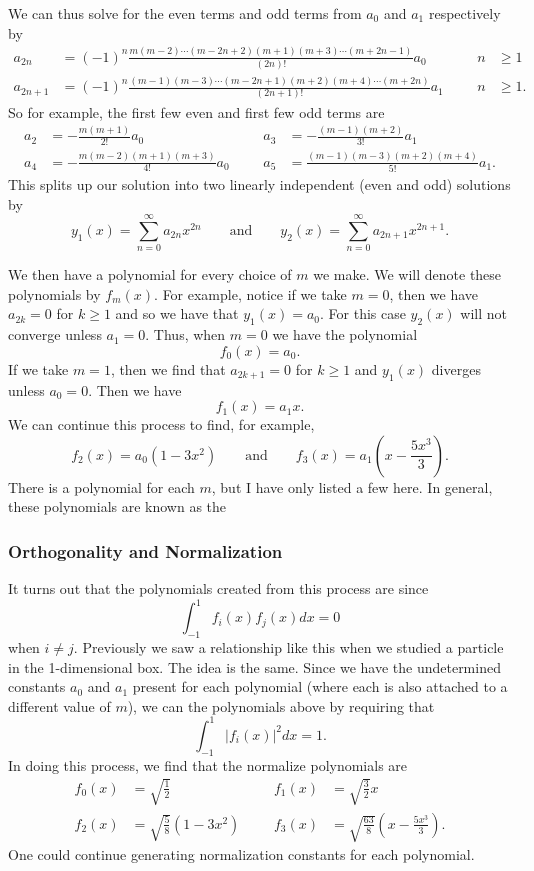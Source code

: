We can thus solve for the even terms and odd terms from $a_0$ and $a_1$ respectively by
\begin{align*}
    a_{2n} &= (-1)^n \frac{m(m-2)\cdots (m-2n+2)(m+1)(m+3)\cdots (m+2n-1)}{(2n)!}a_0 &&& n&\geq 1\\
    a_{2n+1} &= (-1)^n \frac{(m-1)(m-3)\cdots(m-2n+1)(m+2)(m+4)\cdots (m+2n)}{(2n+1)!}a_1 &&& n&\geq 1.
\end{align*}
So for example, the first few even and first few odd terms are
\begin{align*}
    a_2 &= -\frac{m(m+1)}{2!}a_0 &&& a_3 &= -\frac{(m-1)(m+2)}{3!}a_1\\
    a_4 &= -\frac{m(m-2)(m+1)(m+3)}{4!} a_0 &&& a_5 &= \frac{(m-1)(m-3)(m+2)(m+4)}{5!}a_1.
\end{align*}
This splits up our solution into two linearly independent (even and odd) solutions by
\[
y_1(x)=\sum_{n=0}^\infty a_{2n}x^{2n} \qquad \textrm{and} \qquad y_2(x)=\sum_{n=0}^\infty a_{2n+1}x^{2n+1}.
\]

We then have a polynomial for every choice of $m$ we make.  We will denote these polynomials by $f_m(x)$. For example, notice if we take $m=0$, then we have $a_{2k}=0$ for $k\geq 1$ and so we have that $y_1(x)=a_0$. For this case $y_2(x)$ will not converge unless $a_1=0$.  Thus, when $m=0$ we have the polynomial
\[
f_0(x) = a_0. 
\]
If we take $m=1$, then we find that $a_{2k+1}=0$ for $k\geq 1$ and $y_1(x)$ diverges unless $a_0=0$.  Then we have
\[
f_1(x)= a_1 x.
\]
We can continue this process to find, for example,
\[
f_2(x)=a_0(1-3x^2) \qquad \textrm{and} \qquad f_3(x) = a_1\left( x - \frac{5x^3}{3}\right).
\]
There is a polynomial for each $m$, but I have only listed a few here. In general, these polynomials are known as the  

\subsubsection{Orthogonality and Normalization}
It turns out that the polynomials created from this process are  since
\[
\int_{-1}^1 f_i(x)f_j(x)dx = 0
\]
when $i\neq j$.  Previously we saw a relationship like this when we studied a particle in the 1-dimensional box.  The idea is the same.  Since we have the undetermined constants $a_0$ and $a_1$ present for each polynomial (where each is also attached to a different value of $m$), we can  the polynomials above by requiring that
\[
\int_{-1}^1 |f_i(x)|^2 dx = 1.
\]
In doing this process, we find that the normalize polynomials are
\begin{align*}
    f_0(x)&=\sqrt{\frac{1}{2}} &&& f_1(x)&=\sqrt{\frac{3}{2}} x\\
    f_2(x)&= \sqrt{\frac{5}{8}}(1-3x^2) &&& f_3(x)&=\sqrt{\frac{63}{8}}\left( x -\frac{5x^3}{3}\right).
\end{align*}
One could continue generating normalization constants for each polynomial.

